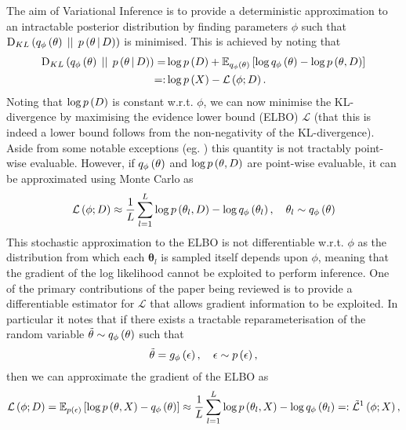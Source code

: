 \documentclass[../report.tex]{subfiles}
\begin{document}
The aim of Variational Inference is to provide a deterministic approximation to an intractable posterior distribution by finding parameters $\phi$ such that $\textrm{D}_{KL} \left( q_\phi \left( \mathbf{\theta}\right) \, \mid \mid \, p \left(\mathbf{\theta} \, \middle\vert \, D \right)\right)$ is minimised. This is achieved by noting that
\begin{align}
  \textrm{D}_{KL} \left( q_\phi \left( \mathbf{\theta}\right) \, \mid \mid \, p \left(\mathbf{\theta} \, \middle\vert \, D \right)\right) =& \log p \left( D\right) + \mathbb{E}_{q_\phi \left( \mathbf{\theta}\right)} \left[ \log q_\phi \left( \mathbf{\theta}\right)  - \log p \left( \mathbf{\theta} ,D\right) \right] \nonumber \\
  =:& \log p \left( X\right) - \mathcal{L} \left( \phi; D\right).
\end{align}
Noting that $\log p \left( D\right)$ is constant w.r.t. $\phi$, we can now minimise the KL-divergence by maximising the evidence lower bound (ELBO) $\mathcal{L}$ (that this is indeed a lower bound follows from the non-negativity of the KL-divergence). Aside from some notable exceptions (eg. \cite{titsias2009variational}) this quantity is not tractably point-wise evaluable. However, if $q_\phi \left( \mathbf{\theta}\right)$ and $\log p \left( \mathbf{\theta}, D\right)$ are point-wise evaluable, it can be approximated using Monte Carlo as
\begin{equation}
  \mathcal{L} \left( \phi; D\right) \approx \frac{1}{L} \sum_{l=1}^{L} \log p \left( \mathbf{\theta}_l ,D\right) - \log q_\phi \left( \mathbf{\theta}_l\right), \quad \mathbf{\theta}_l \sim q_\phi \left( \mathbf{\theta}\right)
\end{equation}
This stochastic approximation to the ELBO is not differentiable w.r.t. $\phi$ as the distribution from which each $\mathbf{\theta}_l$ is sampled itself depends upon $\phi$, meaning that the gradient of the log likelihood cannot be exploited to perform inference. One of the primary contributions of the paper being reviewed is to provide a differentiable estimator for $\mathcal{L}$ that allows gradient information to be exploited. In particular it notes that if there exists a tractable reparameterisation of the random variable $\tilde{\mathbf{\theta}} \sim q_\phi \left( \mathbf{\theta}\right)$ such that
\begin{equation}
  \tilde{\mathbf{\theta}} = g_\phi \left( \epsilon\right), \quad \epsilon \sim p \left( \epsilon\right),
\end{equation}
then we can approximate the gradient of the ELBO as
\begin{equation}
  \mathcal{L} \left( \phi; D\right) = \mathbb{E}_{p \left( \epsilon\right)} \left[ \log p \left( \mathbf{\theta} ,X\right) - q_\phi \left( \mathbf{\theta}\right) \right] \approx \frac{1}{L} \sum_{l=1}^{L} \log p \left( \mathbf{\theta}_l ,X\right) - \log q_\phi \left( \mathbf{\theta}_l\right) =: \tilde{\mathcal{L}}^1 \left( \phi; X\right),
\end{equation}
\end{document}
